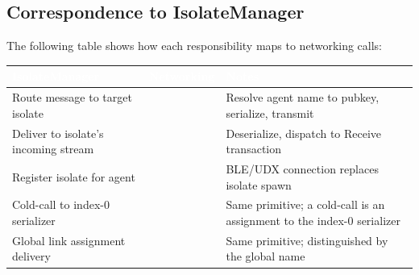 \subsection{Correspondence to IsolateManager}
The following table shows how each  responsibility maps to networking calls:
\begin{longtable}{L{5cm} L{4cm} L{4.5cm}}
\toprule
{}
\textcolor{white}{\textbf{IsolateManager}} &
\textcolor{white}{\textbf{Networking}} &
\textcolor{white}{\textbf{Notes}} \\
\midrule
\endhead
Route message to target isolate &  & Resolve agent name to pubkey, serialize, transmit \\
Deliver to isolate's incoming stream &  & Deserialize, dispatch to Receive transaction \\
Register isolate for agent &  & BLE/UDX connection replaces isolate spawn \\
Cold-call to index-0 serializer &  & Same primitive; a cold-call is an assignment to the index-0 serializer \\
Global link assignment delivery &  & Same primitive; distinguished by the global name \\
\bottomrule
\end{longtable}

